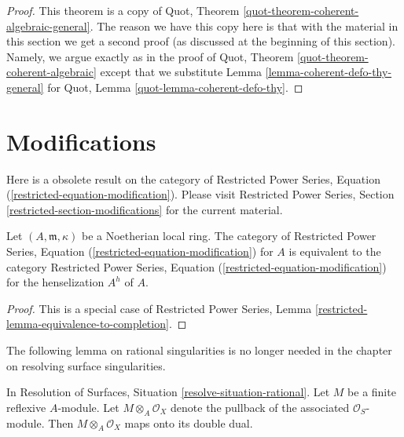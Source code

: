 \begin{proof}
This theorem is a copy of Quot, Theorem
\ref{quot-theorem-coherent-algebraic-general}.
The reason we have this copy here is that with the
material in this section we get a second proof (as discussed
at the beginning of this section). Namely,
we argue exactly as in the proof of
Quot, Theorem \ref{quot-theorem-coherent-algebraic}
except that we substitute
Lemma \ref{lemma-coherent-defo-thy-general} for
Quot, Lemma \ref{quot-lemma-coherent-defo-thy}.
\end{proof}







\section{Modifications}
\label{section-modifications}

\noindent
Here is a obsolete result on the category of
Restricted Power Series, Equation (\ref{restricted-equation-modification}).
Please visit Restricted Power Series, Section
\ref{restricted-section-modifications}
for the current material.

\begin{lemma}
\label{lemma-henselian}
Let $(A, \mathfrak m, \kappa)$ be a Noetherian local ring.
The category of
Restricted Power Series, Equation (\ref{restricted-equation-modification})
for $A$ is equivalent to the category
Restricted Power Series, Equation (\ref{restricted-equation-modification})
for the henselization $A^h$ of $A$.
\end{lemma}

\begin{proof}
This is a special case of Restricted Power Series, Lemma
\ref{restricted-lemma-equivalence-to-completion}.
\end{proof}

\noindent
The following lemma on rational singularities is no longer needed
in the chapter on resolving surface singularities.

\begin{lemma}
\label{lemma-double-dual-rational}
In Resolution of Surfaces, Situation \ref{resolve-situation-rational}.
Let $M$ be a finite reflexive $A$-module. Let $M \otimes_A \mathcal{O}_X$
denote the pullback of the associated $\mathcal{O}_S$-module. Then
$M \otimes_A \mathcal{O}_X$ maps onto its double dual.
\end{lemma}

